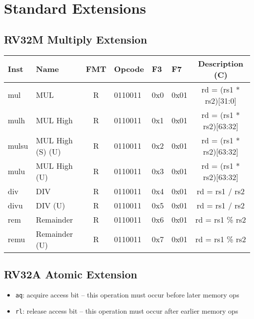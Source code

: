 \section*{Standard Extensions}

\subsection*{RV32M Multiply Extension}
\begin{center}
\begin{tabular}
{T | l | c | T | T | T | C } \hline
\rm Inst & Name              & FMT & \rm Opcode & \rm F3 & \rm F7 & \rm Description (C)     \\ \hline
mul      & MUL               & R   & 0110011    & 0x0    & 0x01   & rd = (rs1 * rs2)[31:0]  \\
mulh     & MUL High          & R   & 0110011    & 0x1    & 0x01   & rd = (rs1 * rs2)[63:32] \\
mulsu    & MUL High (S) (U)  & R   & 0110011    & 0x2    & 0x01   & rd = (rs1 * rs2)[63:32] \\
mulu     & MUL High (U)      & R   & 0110011    & 0x3    & 0x01   & rd = (rs1 * rs2)[63:32] \\
div      & DIV               & R   & 0110011    & 0x4    & 0x01   & rd = rs1 / rs2          \\
divu     & DIV (U)           & R   & 0110011    & 0x5    & 0x01   & rd = rs1 / rs2          \\
rem      & Remainder         & R   & 0110011    & 0x6    & 0x01   & rd = rs1 \% rs2         \\
remu     & Remainder (U)     & R   & 0110011    & 0x7    & 0x01   & rd = rs1 \% rs2         \\
\hline
\end{tabular}
\end{center}

\subsection*{RV32A Atomic Extension}

\begin{itemize}
    \item \texttt{aq}: acquire access bit -- this operation must occur before later memory ops
    \item \texttt{rl}: release access bit -- this operation must occur after earlier memory ops
\end{itemize}

